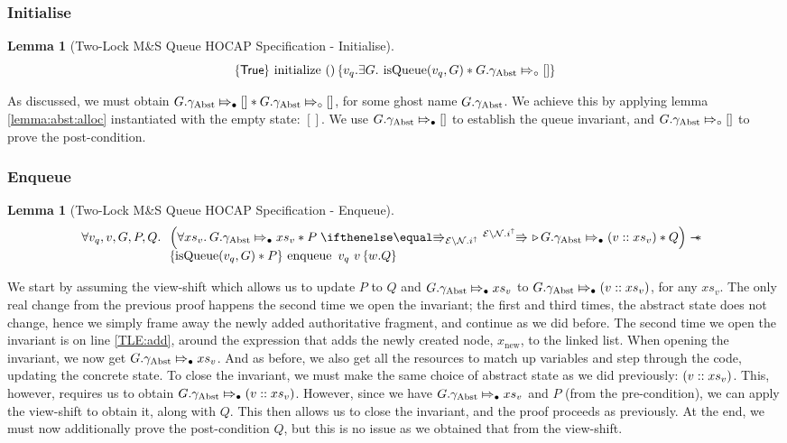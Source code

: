 \documentclass[a4paper, 10pt]{report}
\theoremstyle{definition}
\newtheorem{lemma}[theorem]{Lemma}
\newcommand{\initialise}{\operatorname{initialize}}
\newcommand{\enqueue}{\operatorname{enqueue}}
\newcommand{\msq}{M\&S Queue}
\newcommand{\tlmsq}{Two-Lock \msq{}}
\newcommand{\isqueue}{\operatorname{isQueue}}
\newcommand{\vq}{v_q}
\newcommand{\node}{x}
\newcommand{\nodeN}[1]{\node_{\mathrm{#1}}}
\newcommand{\nodenew}{\nodeN{new}}
\newcommand{\absvalue}{\val}
\newcommand{\absvalueList}{xs_v}
\newcommand{\Qg}{G}
\newcommand{\gabst}{\gname_{\mathrm{Abst}}}
\newcommand{\Nl}{\ensuremath{\mathcal{N}}}
\newcommand{\abstractstatefullfrag}[2]{#1 \Mapsto_{\circ} #2}
\newcommand{\abstractstateauth}[2]{#1 \Mapsto_{\bullet} #2}
\newcommand{\hocapspecinitHTGen}[2]{\hoare{\TRUE}{\initialise \ \TT}{#1 . \Exists #2 . \isqueue(#1, #2) \star{} \abstractstatefullfrag{#2.\gabst}{[]}}}
\newcommand{\hocapspecinitGen}[2]{\hocapspecinitHTGen{#1}{#2}}
\newcommand{\hocapspecinit}{\hocapspecinitGen{\vq}{\Qg}}
\newcommand{\hocapspecenqVS}[5]{\abstractstateauth{#2.\gabst}{#5} \star{} #3 \vs[\mask\setminus\Nl.i^\uparrow] \later \abstractstateauth{#2.\gabst}{(#1 :: #5)} \star{} #4}
\newcommand{\hocapspecenqHT}[5]{\hoare{\isqueue(#1, #3) \star{} #4}{\enqueue \ #1 \ #2}{\valB . #5}}
\newcommand{\hocapspecenqGen}[6]{\All #1, #2, #3, #4, #5.
\begin{array}[t]{l}
\left(\All #6 . \hocapspecenqVS{#2}{#3}{#4}{#5}{#6} \right)
\wand\\
\hocapspecenqHT{#1}{#2}{#3}{#4}{#5}
\end{array}}
\newcommand{\hocapspecenq}{\hocapspecenqGen{\vq}{\absvalue}{\Qg}{P}{Q}{\absvalueList}}
\begin{document}
\subsubsection{Initialise}
\begin{lemma}[\tlmsq{} HOCAP Specification - Initialise]\label{TLMSQ:spec:hocap:initialise}
  \begin{equation*}
    \hocapspecinit
  \end{equation*}
\end{lemma}
As discussed, we must obtain $\abstractstateauth{\Qg.\gabst}{[]} \star{} \abstractstatefullfrag{\Qg.\gabst}{[]}$, for some ghost name $\Qg.\gabst$. We achieve this by applying lemma \ref{lemma:abst:alloc} instantiated with the empty state: $[]$. We use $\abstractstateauth{\Qg.\gabst}{[]}$ to establish the queue invariant, and $\abstractstatefullfrag{\Qg.\gabst}{[]}$ to prove the post-condition.


\subsubsection{Enqueue}
\begin{lemma}[\tlmsq{} HOCAP Specification - Enqueue]\label{TLMSQ:spec:hocap:enqueue}
  \begin{equation*}
    \hocapspecenq
  \end{equation*}
\end{lemma}
We start by assuming the view-shift which allows us to update $P$ to $Q$ and $\abstractstateauth{\Qg.\gabst}{\absvalueList}$ to $\abstractstateauth{\Qg.\gabst}{(\absvalue :: \absvalueList)}$, for any $\absvalueList$. The only real change from the previous proof happens the second time we open the invariant; the first and third times, the abstract state does not change, hence we simply frame away the newly added authoritative fragment, and continue as we did before. The second time we open the invariant is on line \ref{TLE:add}, around the expression that adds the newly created node, $\nodenew$, to the linked list. When opening the invariant, we now get $\abstractstateauth{\Qg.\gabst}{\absvalueList}$. And as before, we also get all the resources to match up variables and step through the code, updating the concrete state. To close the invariant, we must make the same choice of abstract state as we did previously: $(\absvalue :: \absvalueList)$. This, however, requires us to obtain $\abstractstateauth{\Qg.\gabst}{(\absvalue :: \absvalueList)}$. However, since we have $\abstractstateauth{\Qg.\gabst}{\absvalueList}$ and $P$ (from the pre-condition), we can apply the view-shift to obtain it, along with $Q$. This then allows us to close the invariant, and the proof proceeds as previously. At the end, we must now additionally prove the post-condition $Q$, but this is no issue as we obtained that from the view-shift.
\end{document}
